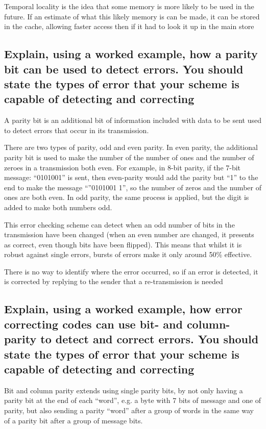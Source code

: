 \documentclass{article}
\begin{document}
Temporal locality is the idea that some memory is more likely to be used
in the future. If an estimate of what this likely memory is can be made,
it can be stored in the cache, allowing faster access then if it had to
look it up in the main store


\subsection{Explain, using a worked example, how a parity bit can be
used to detect errors. You should state the types of error that your
scheme is capable of detecting and correcting}

A parity bit is an additional bit of information included with data to
be sent used to detect errors that occur in its transmission.

There are two types of parity, odd and even parity. In even parity, the
additional parity bit is used to make the number of the number of ones
and the number of zeroes in a transmission both even. For example, in
8-bit parity, if the 7-bit message: ``0101001'' is sent, then
even-parity would add the parity but ``1'' to the end to make the
message ``''0101001 1'', so the number of zeros and the number of ones
are both even. In odd parity, the same process is applied, but the digit
is added to make both numbers odd.

This error checking scheme can detect when an odd number of bits in the
transmission have been changed (when an even number are changed, it
presents as correct, even though bits have been flipped). This means
that whilst it is robust against single errors, bursts of errors make it
only around 50\% effective.

There is no way to identify where the error occurred, so if an error is
detected, it is corrected by replying to the sender that a
re-transmission is needed


\subsection{Explain, using a worked example, how error correcting codes
can use bit- and column-parity to detect and correct errors. You should
state the types of error that your scheme is capable of detecting and
correcting}

Bit and column parity extends using single parity bits, by not only
having a parity bit at the end of each ``word'', e.g. a byte with 7 bits
of message and one of parity, but also sending a parity ``word'' after a
group of words in the same way of a parity bit after a group of message
bits.
\end{document}
